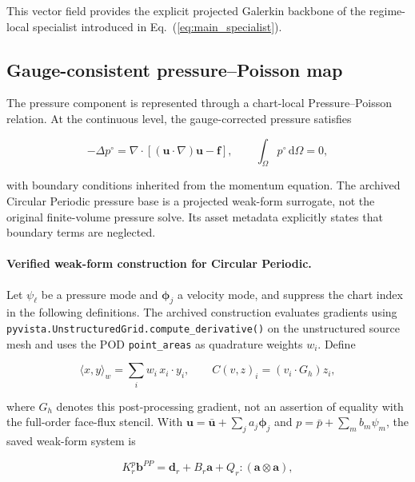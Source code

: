 \documentclass{article}
\def\plaineqref#1{\ref{#1}}
\begin{document}
This vector field provides the explicit projected Galerkin backbone of the
regime-local specialist introduced in
Eq.~(\plaineqref{eq:main_specialist}).


\subsection{Gauge-consistent pressure--Poisson map}

The pressure component is represented through a chart-local
Pressure--Poisson relation.
At the continuous level, the gauge-corrected pressure satisfies


\begin{equation}
    -\Delta p^\circ
    =
    \nabla\!\cdot
    \left[
        (\bm u\!\cdot\!\nabla)\bm u
        -
        \bm f
    \right],
    \qquad
    \int_\Omega p^\circ\,\mathrm d\Omega=0,
    \label{eq:app_continuous_pressure_poisson}
\end{equation}


with boundary conditions inherited from the momentum equation. The archived Circular Periodic pressure base is a projected weak-form surrogate, not the original finite-volume pressure solve. Its asset metadata explicitly states that boundary terms are neglected.

\paragraph{Verified weak-form construction for Circular Periodic.}
Let $\psi_\ell$ be a pressure mode and $\bm\phi_j$ a velocity mode, and suppress the chart index in the following definitions. The archived construction evaluates gradients using \texttt{pyvista.UnstructuredGrid.compute\_derivative()} on the unstructured source mesh and uses the POD \texttt{point\_areas} as quadrature weights $w_i$. Define


\begin{equation}
 \langle x,y\rangle_w=\sum_i w_i\,x_i\cdot y_i,
 \qquad
 C(v,z)_i=(v_i\cdot G_h)z_i ,
\end{equation}


where $G_h$ denotes this post-processing gradient, not an assertion of equality with the full-order face-flux stencil. With $\bm u=\bar{\bm u}+\sum_j a_j\bm\phi_j$ and $p=\bar p+\sum_m b_m\psi_m$, the saved weak-form system is


\begin{equation}
 K_r^p\bm b^{PP}=\bm d_r+B_r\bm a+Q_r:(\bm a\otimes\bm a),
 \label{eq:app_pressure_poisson_system}
\end{equation}
\end{document}
